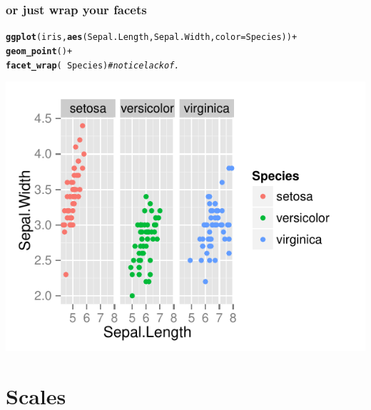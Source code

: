 \documentclass{beamer}\usepackage[]{graphicx}\usepackage[]{color}
\makeatletter
\newcommand{\hlcom}[1]{\textcolor[rgb]{0.678,0.584,0.686}{\textit{#1}}}%
\newcommand{\hlopt}[1]{\textcolor[rgb]{0,0,0}{#1}}%
\newcommand{\hlstd}[1]{\textcolor[rgb]{0.345,0.345,0.345}{#1}}%
\newcommand{\hlkwc}[1]{\textcolor[rgb]{0.333,0.667,0.333}{#1}}%
\newcommand{\hlkwd}[1]{\textcolor[rgb]{0.737,0.353,0.396}{\textbf{#1}}}%
\newenvironment{kframe}{%
 \def\at@end@of@kframe{}%
 \ifinner\ifhmode%
  \def\at@end@of@kframe{\end{minipage}}%
  \begin{minipage}{\columnwidth}%
 \fi\fi%
 \def\FrameCommand##1{\hskip\@totalleftmargin \hskip-\fboxsep
 \colorbox{shadecolor}{##1}\hskip-\fboxsep
     \hskip-\linewidth \hskip-\@totalleftmargin \hskip\columnwidth}%
 \MakeFramed {\advance\hsize-\width
   \@totalleftmargin\z@ \linewidth\hsize
   \@setminipage}}%
 {\par\unskip\endMakeFramed%
 \at@end@of@kframe}
\newenvironment{knitrout}{}{} %
\makeatother
\begin{document}
\begin{frame}[fragile]
\frametitle{or just wrap your facets}
\begin{knitrout}\footnotesize
{}\color{fgcolor}\begin{kframe}
\begin{alltt}
\hlkwd{ggplot}\hlstd{(iris,} \hlkwd{aes}\hlstd{(Sepal.Length, Sepal.Width,} \hlkwc{color} \hlstd{= Species))} \hlopt{+}
    \hlkwd{geom_point}\hlstd{()} \hlopt{+}
    \hlkwd{facet_wrap}\hlstd{(} \hlopt{~} \hlstd{Species)} \hlcom{# notice lack of .}
\end{alltt}
\end{kframe}

{\centering \includegraphics[width=.75\linewidth]{figure/facet_wrap} 

}



\end{knitrout}
\end{frame}


\section*{Scales}
\frame{\sectionpage}

\end{document}
